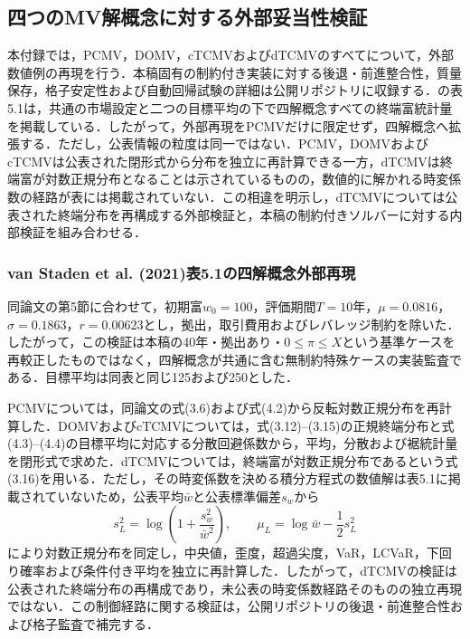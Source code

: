 \documentclass[10pt,a4paper]{article}
\theoremstyle{plain}
\theoremstyle{definition}
\begin{document}
\subsection{四つのMV解概念に対する外部妥当性検証}
\label{app:four-model-validation}

本付録では，PCMV，DOMV，cTCMVおよびdTCMVのすべてについて，外部数値例の再現を行う．本稿固有の制約付き実装に対する後退・前進整合性，質量保存，格子安定性および自動回帰試験の詳細は公開リポジトリに収録する．\citet{vanStadenDangForsyth2021}の表5.1は，共通の市場設定と二つの目標平均の下で四解概念すべての終端富統計量を掲載している．したがって，外部再現をPCMVだけに限定せず，四解概念へ拡張する．ただし，公表情報の粒度は同一ではない．PCMV，DOMVおよびcTCMVは公表された閉形式から分布を独立に再計算できる一方，dTCMVは終端富が対数正規分布となることは示されているものの，数値的に解かれる時変係数の経路が表には掲載されていない．この相違を明示し，dTCMVについては公表された終端分布を再構成する外部検証と，本稿の制約付きソルバーに対する内部検証を組み合わせる．

\subsubsection{van Staden et al. (2021)表5.1の四解概念外部再現}

同論文の第5節に合わせて，初期富$w_0=100$，評価期間$T=10$年，$\mu=0.0816$，$\sigma=0.1863$，$r=0.00623$とし，拠出，取引費用およびレバレッジ制約を除いた．したがって，この検証は本稿の40年・拠出あり・$0\leq\pi\leq X$という基準ケースを再較正したものではなく，四解概念が共通に含む無制約特殊ケースの実装監査である．目標平均は同表と同じ125および250とした．

PCMVについては，同論文の式(3.6)および式(4.2)から反転対数正規分布を再計算した．DOMVおよびcTCMVについては，式(3.12)--(3.15)の正規終端分布と式(4.3)--(4.4)の目標平均に対応する分散回避係数から，平均，分散および裾統計量を閉形式で求めた．dTCMVについては，終端富が対数正規分布であるという式(3.16)を用いる．ただし，その時変係数を決める積分方程式の数値解は表5.1に掲載されていないため，公表平均$\bar w$と公表標準偏差$s_w$から
\begin{equation}
 s_L^2=\log\!\left(1+\frac{s_w^2}{\bar w^2}\right),
 \qquad
 \mu_L=\log \bar w-\frac12s_L^2
 \label{eq:dtcmv-external-lognormal-identification}
\end{equation}
により対数正規分布を同定し，中央値，歪度，超過尖度，VaR，LCVaR，下回り確率および条件付き平均を独立に再計算した．したがって，dTCMVの検証は公表された終端分布の再構成であり，未公表の時変係数経路そのものの独立再現ではない．この制御経路に関する検証は，公開リポジトリの後退・前進整合性および格子監査で補完する．
\end{document}
